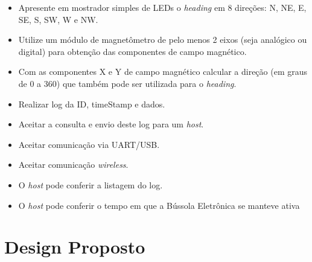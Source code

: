 \documentclass[10pt,twocolumn,letterpaper]{article}
\begin{document}
\begin{itemize}
    \item Apresente em mostrador simples de LEDs o \emph{heading} em 8 direções: N, NE, E, SE, S, SW, W e NW.
    \item Utilize um módulo de magnetômetro de pelo menos 2 eixos (seja analógico ou digital) para obtenção 
    das componentes de campo magnético.
    \item Com as componentes X e Y de campo magnético calcular a direção (em graus de 0 a 360) que também 
    pode ser utilizada para o \emph{heading}.
    \item Realizar log da ID, timeStamp e dados.
    \item Aceitar a consulta e envio deste log para um \emph{host}.
    \item Aceitar comunicação via UART/USB.
    \item Aceitar comunicação \emph{wireless}.
    \item O \emph{host} pode conferir a listagem do log.
    \item O \emph{host} pode conferir o tempo em que a Bússola Eletrônica se manteve ativa 
\end{itemize}


\section{Design Proposto}
\end{document}
